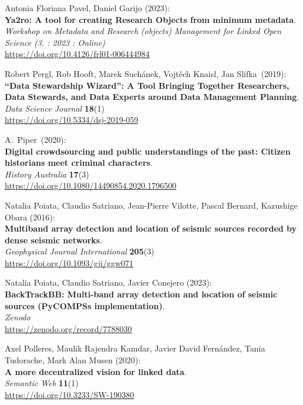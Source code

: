 \begin{thebibliography}{9}
Antonia Floriana Pavel, Daniel Garijo (2023):\\
\textbf{Ya2ro: A tool for creating Research Objects from minimum metadata}.\\
\emph{Workshop on Metadata and Research (objects) Management for Linked Open Science (3. : 2023 : Online)}\\
\url{https://doi.org/10.4126/frl01-006444984}

Robert Pergl, Rob Hooft, Marek Suchánek, Vojtěch
Knaisl, Jan Slifka~(2019):\\
\textbf{``Data Stewardship Wizard'': A Tool Bringing Together
Researchers, Data Stewards, and Data Experts around Data Management
Planning}.\\
\emph{Data Science Journal} \textbf{18}(1)\\
\url{https://doi.org/10.5334/dsj-2019-059}

A.~Piper~(2020):\\
\textbf{Digital crowdsourcing and public understandings of the past:
Citizen historians meet criminal characters}.\\
\emph{History Australia} \textbf{17}(3) \\
\url{https://doi.org/10.1080/14490854.2020.1796500}

Natalia Poiata, Claudio Satriano, Jean-Pierre Vilotte, Pascal Bernard, Kazushige Obara (2016):\\
\textbf{Multiband array detection and location of seismic sources recorded by dense seismic networks}.\\
\emph{Geophysical Journal International} \textbf{205}(3)\\
\url{https://doi.org/10.1093/gji/ggw071}

Natalia Poiata, Claudio Satriano, Javier Conejero (2023):\\
\textbf{BackTrackBB: Multi-band array detection and location of seismic sources (PyCOMPSs implementation)}.\\
\emph{Zenodo}\\
\url{https://zenodo.org/record/7788030}


Axel Polleres, Maulik Rajendra Kamdar, Javier David Fernández, Tania
Tudorache, Mark Alan Musen (2020): \\
\textbf{A more decentralized vision for linked data}.\\ 
\emph{Semantic Web} \textbf{11}(1) \\
\url{https://doi.org/10.3233/SW-190380}


\end{thebibliography}
